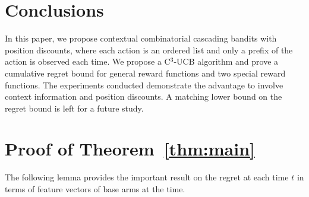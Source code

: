 \documentclass{article}
\begin{document}
\section{Conclusions}

In this paper, we propose contextual combinatorial cascading bandits with position discounts, where each action is an ordered list and only a prefix of the action is observed each time. We propose a C$^3$-UCB algorithm and prove a cumulative regret bound for general reward functions and two special reward functions. The experiments conducted demonstrate the advantage to involve context information and position discounts. A matching lower bound on the regret bound is left for a future study.



\newpage



\newpage

\appendix

\section{Proof of Theorem~\ref{thm:main}}

The following lemma provides the important result on the regret at each time $t$ in terms of feature vectors of base arms at the time.
\end{document}
